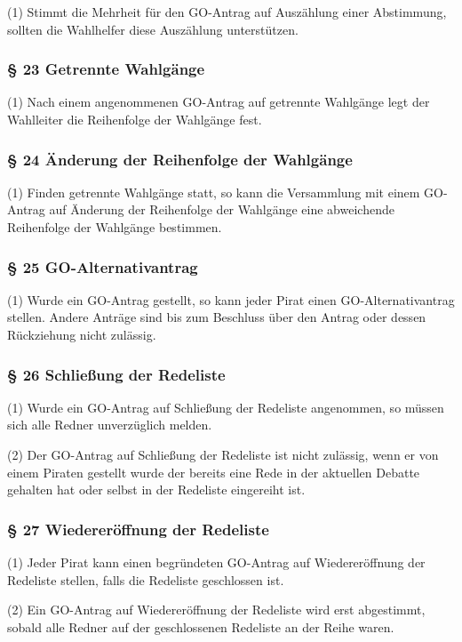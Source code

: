 (1) Stimmt die Mehrheit für den GO-Antrag auf Auszählung einer
Abstimmung, sollten die Wahlhelfer diese Auszählung unterstützen.

\subsubsection{§ 23 Getrennte Wahlgänge}

(1) Nach einem angenommenen GO-Antrag auf getrennte Wahlgänge legt der
Wahlleiter die Reihenfolge der Wahlgänge fest.

\subsubsection{§ 24 Änderung der Reihenfolge der Wahlgänge}

(1) Finden getrennte Wahlgänge statt, so kann die Versammlung mit einem
GO-Antrag auf Änderung der Reihenfolge der Wahlgänge eine abweichende
Reihenfolge der Wahlgänge bestimmen.

\subsubsection{§ 25 GO-Alternativantrag}

(1) Wurde ein GO-Antrag gestellt, so kann jeder Pirat einen
GO-Alternativantrag stellen. Andere Anträge sind bis zum Beschluss über
den Antrag oder dessen Rückziehung nicht zulässig.

\subsubsection{§ 26 Schließung der Redeliste}

(1) Wurde ein GO-Antrag auf Schließung der Redeliste angenommen, so
müssen sich alle Redner unverzüglich melden.

(2) Der GO-Antrag auf Schließung der Redeliste ist nicht zulässig, wenn
er von einem Piraten gestellt wurde der bereits eine Rede in der
aktuellen Debatte gehalten hat oder selbst in der Redeliste eingereiht
ist.

\subsubsection{§ 27 Wiedereröffnung der Redeliste}

(1) Jeder Pirat kann einen begründeten GO-Antrag auf Wiedereröffnung der
Redeliste stellen, falls die Redeliste geschlossen ist.

(2) Ein GO-Antrag auf Wiedereröffnung der Redeliste wird erst
abgestimmt, sobald alle Redner auf der geschlossenen Redeliste an der
Reihe waren.

